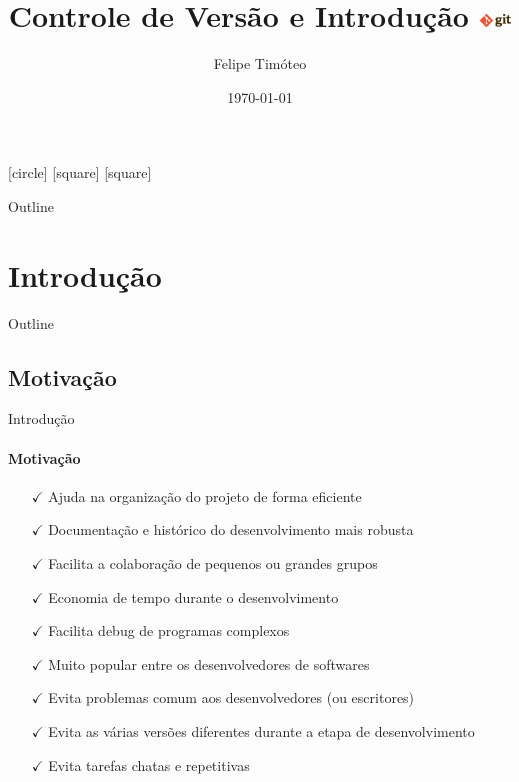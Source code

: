 \documentclass[xcolor=dvipsnames,t]{beamer}
\title[Git]{Controle de Versão e Introdução \includegraphics[height=0.35cm]{figures/gitlogo.png}}
\author[@fetim]{Felipe Timóteo}
\institute{GISIS \& DOT-UFF }
\date{\today}
\begin{document}
\begin{frame}
  \titlepage
\end{frame}

[circle]
[square]
[square]
\begin{frame}{Outline}
	\tiny
	\tableofcontents%
\end{frame}

\section{Introdução}
\begin{frame}{Outline}
\tiny
\tableofcontents[current]
\end{frame}

\subsection{Motivação}
\begin{frame}{Introdução}
\framesubtitle{Motivação}

\begin{itemize}[<+->]
	\item[$ \checkmark $] Ajuda na organização do projeto de forma eficiente
	\item[$ \checkmark $] Documentação e histórico do desenvolvimento mais robusta
	\item[$ \checkmark $] Facilita a colaboração de pequenos ou grandes grupos
	\item[$ \checkmark $] Economia de tempo durante o desenvolvimento
	\item[$ \checkmark $] Facilita debug de programas complexos
	\item[$ \checkmark $] Muito popular entre os desenvolvedores de softwares
	\item[$ \checkmark $] Evita problemas comum aos desenvolvedores (ou escritores)
	\item[$ \checkmark $] Evita as várias versões diferentes durante a etapa de desenvolvimento
	\item[$ \checkmark $] Evita tarefas chatas e repetitivas
\end{itemize}
\end{frame}
\end{document}
